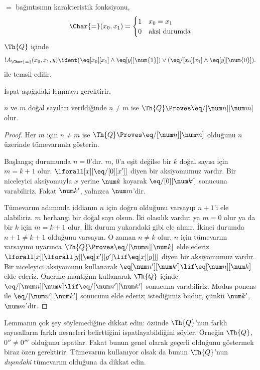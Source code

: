 \begin{prop}
$=$ bağıntısının karakteristik fonksiyonu,
\[
\Char{=}(x_0, x_1) =
\begin{cases}
  1 & x_0 =x_1\\
  0 & \text{aksi durumda}
\end{cases}
\]
$\Th{Q}$ içinde
\[
  !A_{\Char{=}}(x_0, x_1, y) \ident (\eq[x_0][x_1] \land \eq[y][\num{1}]) \lor (\eq/[x_0][x_1] \land
\eq[y][\num{0}]).
\]
ile temsil edilir.
\end{prop}

İspat aşağıdaki lemmayı gerektirir.

\begin{lem}
 $n$ ve $m$ doğal sayıları verildiğinde $n\neq m$
ise $\Th{Q} \Proves \eq/[\num n][\num m]$ olur.
\end{lem}

\begin{proof}
Her $m$ için $n\neq m$ ise $\Th{Q} \Proves \eq/[\num n][\num m]$ olduğunu
$n$ üzerinde tümevarımla gösterin.

Başlangıç durumunda $n=0$'dır. $m$, $0$'a eşit değilse bir $k$ doğal sayısı
için $m=k+1$ olur. $\lforall[x][\eq/[0][x']]$ diyen bir aksiyomumuz vardır.
Bir niceleyici aksiyomuyla $x$ yerine $\num k$ koyarak
$\eq/[0][\num k']$ sonucuna varabiliriz. Fakat $\num k'$, yalnızca
$\num m$'dir.

Tümevarım adımında iddianın $n$ için doğru olduğunu varsayıp $n+1$'i ele
alabiliriz. $m$ herhangi bir doğal sayı olsun. İki olasılık vardır: ya $m=0$
olur ya da bir $k$ için $m=k+1$ olur. İlk durum yukarıdaki gibi ele alınır.
İkinci durumda $n+1\neq k+1$ olduğunu varsayın. O zaman $n\neq k$ olur.
$n$ için tümevarım varsayımı uyarınca
$\Th{Q} \Proves \eq/[\num n][\num k]$ elde ederiz.
$\lforall[x][\lforall[y][\eq[x'][y'] \lif \eq[x][y]]]$ diyen bir
aksiyomumuz vardır. Bir niceleyici aksiyomunu kullanarak
$\eq[\num n'][\num k'] \lif \eq[\num n][\num k]$ elde ederiz. Önerme
mantığını kullanarak $\Th{Q}$ içinde
$\eq/[\num n][\num k] \lif \eq/[\num n'][\num k']$ sonucuna varabiliriz.
Modus ponens ile $\eq/[\num n'][\num k']$ sonucunu elde ederiz; istediğimiz
budur, çünkü $\num k'$, $\num m$'dir.
\end{proof}

\begin{explain}
Lemmanın çok şey söylemediğine dikkat edin: özünde $\Th{Q}$'nun farklı
sayısalların farklı nesneleri belirttiğini ispatlayabildiğini söyler.
Örneğin $\Th{Q}$, $0''\neq0'''$ olduğunu ispatlar. Fakat bunun genel olarak
geçerli olduğunu göstermek biraz özen gerektirir. Tümevarım kullanıyor olsak
da bunun $\Th{Q}$'nun \emph{dışındaki} tümevarım olduğuna da dikkat edin.
\end{explain}

